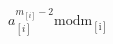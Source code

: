 \documentclass{article}
\begin{document}
$ a_[i]^{m_[i] - 2} \mathrm{mod m_[i]} $
\pagebreak
\end{document}
